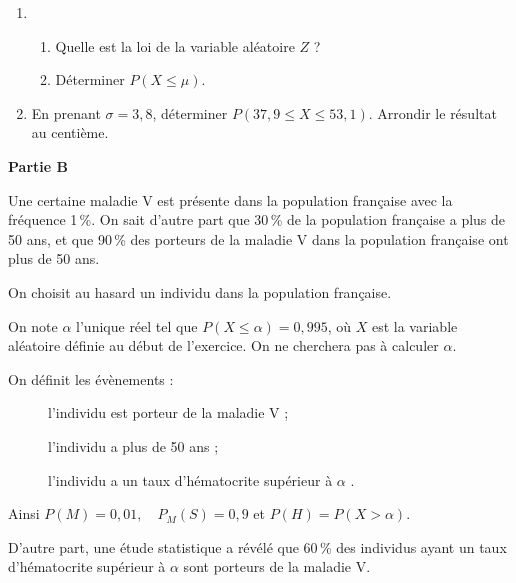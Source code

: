 \documentclass[10pt]{article}
\begin{document}
\medskip

\begin{enumerate}
\item 
	\begin{enumerate}
		\item Quelle est la loi de la variable aléatoire $Z$ ?
		\item Déterminer $P(X \leqslant \mu)$.		
	\end{enumerate}
\item En prenant $\sigma = 3,8$, déterminer $P(37,9 \leqslant X \leqslant 53,1)$. Arrondir le résultat au centième.
\end{enumerate}

\bigskip

\textbf{Partie B}

\medskip

Une certaine maladie V est présente dans la population française avec la fréquence 1\,\%. On sait d'autre part que 30\,\% de la population française a plus de 50 ans, et que 90\,\% des porteurs de la maladie V dans la population française ont plus de 50 ans.

\smallskip

On choisit au hasard un individu dans la population française.

On note $\alpha$ l'unique réel tel que $P(X \leqslant \alpha) = 0,995$, où $X$ est la variable aléatoire  définie au début de l'exercice. On ne cherchera pas à calculer $\alpha$.

\smallskip

On définit les évènements :

\setlength\parindent{10mm}
\begin{description}
\item[ ] \og l'individu est porteur de la maladie V \fg ;
\item[ ] \og l'individu a plus de 50 ans \fg{} ; 
\item[ ] \og l'individu a un taux d'hématocrite supérieur à $\alpha$ \fg. 
\end{description}
\setlength\parindent{0mm}

Ainsi $P(M) = 0,01, \quad P_{M}(S) = 0,9$ et $P(H) = P(X > \alpha)$.

D'autre part, une étude statistique a révélé que 60\,\% des individus ayant un taux d'hématocrite supérieur à $\alpha$
sont porteurs de la maladie V.

\medskip
\end{document}

